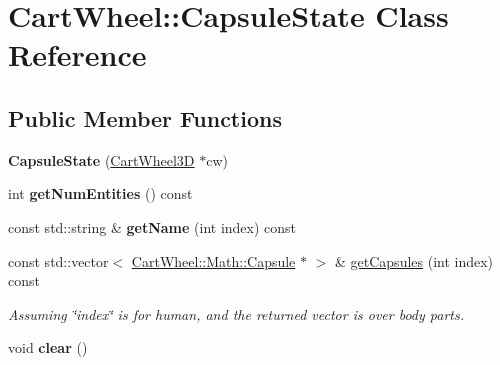 \hypertarget{classCartWheel_1_1CapsuleState}{
\section{CartWheel::CapsuleState Class Reference}
\label{classCartWheel_1_1CapsuleState}
}
\subsection*{Public Member Functions}
\begin{DoxyCompactItemize}
\item 
\hypertarget{classCartWheel_1_1CapsuleState_a59255cfe6ce804af5d3ed594e9954ca3}{
{\bfseries CapsuleState} (\hyperlink{classCartWheel_1_1CartWheel3D}{CartWheel3D} $\ast$cw)}
\label{classCartWheel_1_1CapsuleState_a59255cfe6ce804af5d3ed594e9954ca3}

\item 
\hypertarget{classCartWheel_1_1CapsuleState_a080df7b6d576b0f4a3b4282899ad3f9d}{
int {\bfseries getNumEntities} () const }
\label{classCartWheel_1_1CapsuleState_a080df7b6d576b0f4a3b4282899ad3f9d}

\item 
\hypertarget{classCartWheel_1_1CapsuleState_a1db7093290eca8efa1f767ace2b915e0}{
const std::string \& {\bfseries getName} (int index) const }
\label{classCartWheel_1_1CapsuleState_a1db7093290eca8efa1f767ace2b915e0}

\item 
\hypertarget{classCartWheel_1_1CapsuleState_a3f06c9a04db8db80e90f746fbc64f625}{
const std::vector$<$ \hyperlink{classCartWheel_1_1Math_1_1Capsule}{CartWheel::Math::Capsule} $\ast$ $>$ \& \hyperlink{classCartWheel_1_1CapsuleState_a3f06c9a04db8db80e90f746fbc64f625}{getCapsules} (int index) const }
\label{classCartWheel_1_1CapsuleState_a3f06c9a04db8db80e90f746fbc64f625}

\begin{DoxyCompactList}\small\item\em Assuming \char`\"{}index\char`\"{} is for human, and the returned vector is over body parts. \item\end{DoxyCompactList}\item 
\hypertarget{classCartWheel_1_1CapsuleState_a00fc76c10b437840f1422a2607fa65c1}{
void {\bfseries clear} ()}
\label{classCartWheel_1_1CapsuleState_a00fc76c10b437840f1422a2607fa65c1}

\end{DoxyCompactItemize}

